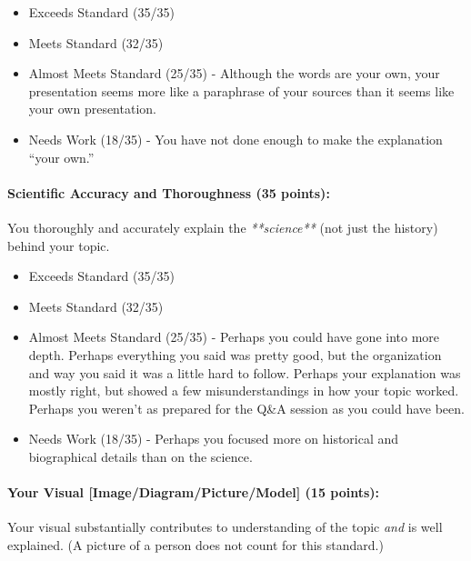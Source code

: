 \documentclass[11pt]{exam}
\begin{document}
\begin{itemize}
  \item Exceeds Standard (35/35)
  \item Meets Standard (32/35)
  \item Almost Meets Standard (25/35) - 
    Although the words are your own, your presentation seems more like a paraphrase of your sources than it seems like your own presentation. 
  \item Needs Work (18/35) -
    You have not done enough to make the explanation ``your own.''
  
\end{itemize}



\paragraph{Scientific Accuracy and Thoroughness (35 points):} 
  You thoroughly and accurately explain the \emph{**science**} (not just the history) behind your topic.
  

\begin{itemize}
  \item Exceeds Standard (35/35)
  \item Meets Standard (32/35)
  \item Almost Meets Standard (25/35) - 
    Perhaps you could have gone into more depth.  Perhaps everything you said was pretty good, but the organization and way you said it was a little hard to follow.  Perhaps your explanation was mostly right, but showed a few misunderstandings in how your topic worked.  Perhaps you weren't as prepared for the Q\&A session as you could have been.
  \item Needs Work (18/35) -
    Perhaps you focused more on historical and biographical details than on the science.
  
\end{itemize}



\paragraph{Your Visual [Image/Diagram/Picture/Model] (15 points): } 
  Your visual substantially contributes to understanding of the topic \emph{and} is well explained. (A picture of a person does not count for this standard.) 
  
\end{document}
